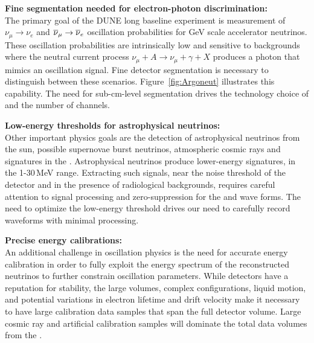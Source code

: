 \documentclass[../main-v1.tex]{subfiles}
\begin{document}
\begin{description}
\item{\bf Fine segmentation needed for electron-photon discrimination: \\}   The primary goal of the DUNE long baseline experiment is measurement of $\nu_\mu\rightarrow\nu_e$ and $\overline{\nu}_\mu\rightarrow\overline{\nu}_e$
oscillation probabilities for GeV scale accelerator neutrinos.   These oscillation probabilities are intrinsically low and sensitive to backgrounds where the neutral current process  $\nu_\mu+A\rightarrow\nu_\mu+\gamma+X$
produces a photon that %
mimics an oscillation signal.  Fine detector segmentation is necessary to distinguish between these scenarios. Figure~\ref{fig:Argoneut} illustrates this capability. The need for sub-cm-level segmentation drives the technology choice of  and %
the number of channels.   
\item{\bf Low-energy thresholds for astrophysical neutrinos: \\}
Other important physics goals are the detection of astrophysical neutrinos from the sun, possible supernovae burst neutrinos, atmospheric cosmic rays and %
 signatures in the .  Astrophysical neutrinos produce lower-energy signatures, in the 1-30\,MeV range. Extracting such signals, near the noise threshold of the detector and in the presence of radiological backgrounds, requires careful attention to signal processing and zero-suppression for the   and  wave forms.  The need to optimize the low-energy threshold drives our need to carefully record waveforms with minimal processing. 

\item{\bf Precise energy calibrations:\\}
An additional challenge in oscillation physics is the need for accurate energy calibration in order to fully %
exploit the energy spectrum of the reconstructed neutrinos to further constrain oscillation parameters. While  detectors have a reputation for stability, the large volumes, complex \efield configurations, liquid motion, and potential variations in electron lifetime and drift velocity make it necessary to have large calibration data samples that span the full  detector volume.  Large cosmic ray and artificial calibration samples will dominate the total data volumes from the . 


\end{description}
\end{document}
